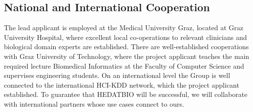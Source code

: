 \documentclass[a4paper,11pt]{article}
\begin{document}

%
\subsection{National and International Cooperation} 

The lead applicant is employed at the Medical University Graz, located at Graz University Hospital, where excellent local co-operations to relevant clinicians and biological domain experts are established. There are well-established cooperations with Graz University of Technology, where the project applicant teaches the main required lecture Biomedical Informatics at the Faculty of Computer Science and supervises engineering students. On an international level the Group is well connected to the international HCI-KDD network, which the project applicant established. To guarantee that HEDATBIO will be successful, we will collaborate with international partners whose use cases connect to ours. 
\\[0,2cm]
\end{document}

